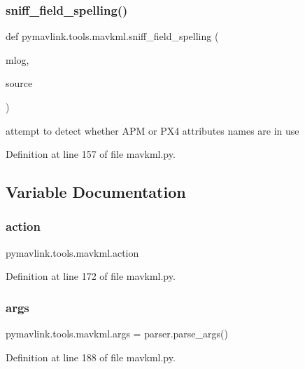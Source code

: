 \subsubsection{\texorpdfstring{sniff\_field\_spelling()}{sniff\_field\_spelling()}}
{\footnotesize\ttfamily def pymavlink.\+tools.\+mavkml.\+sniff\+\_\+field\+\_\+spelling (\begin{DoxyParamCaption}\item[{}]{mlog,  }\item[{}]{source }\end{DoxyParamCaption})}

\begin{DoxyVerb}attempt to detect whether APM or PX4 attributes names are in use\end{DoxyVerb}
 

Definition at line 157 of file mavkml.\+py.



\subsection{Variable Documentation}
\mbox{\label{namespacepymavlink_1_1tools_1_1mavkml_ad9aae12df2537904d826fbe65008f651}} 
\subsubsection{\texorpdfstring{action}{action}}
{\footnotesize\ttfamily pymavlink.\+tools.\+mavkml.\+action}



Definition at line 172 of file mavkml.\+py.

\mbox{\label{namespacepymavlink_1_1tools_1_1mavkml_aed6f203ddb846d8e9662684b3f62f48c}} 
\subsubsection{\texorpdfstring{args}{args}}
{\footnotesize\ttfamily pymavlink.\+tools.\+mavkml.\+args = parser.\+parse\+\_\+args()}



Definition at line 188 of file mavkml.\+py.

